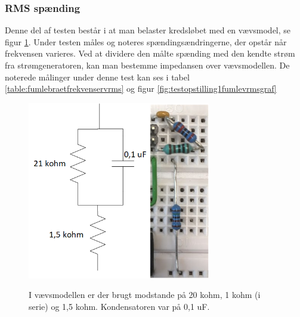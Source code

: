 \pagebreak

\subsubsection{RMS spænding}

Denne del af testen består i at man belaster kredsløbet med en vævsmodel, se figur \ref{fig:testopstilling1fumlevaevs}. Under testen måles og noteres spændingsændringerne, der opstår når frekvensen varieres. Ved at dividere den målte spænding med den kendte strøm fra strømgeneratoren, kan man bestemme impedansen over vævsmodellen. De noterede målinger under denne test kan ses i tabel \ref{table:fumlebraetfrekvenservrms} og figur \ref{fig:testopstilling1fumlevrmsgraf}



\begin{figure}[H]
\centering
{\includegraphics[width=8cm]
{Figure/testopstilling1fumlevaevs}}
\caption{I vævsmodellen er der brugt modstande på 20 kohm, 1 kohm (i serie) og 1,5 kohm. Kondensatoren var på 0,1 uF.}
\label{fig:testopstilling1fumlevaevs}
\end{figure}


